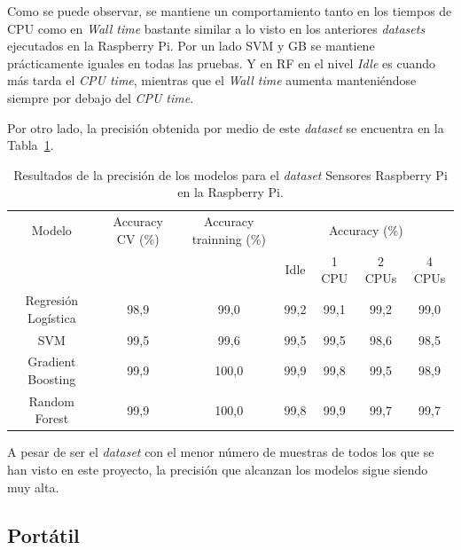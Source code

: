 \documentclass[a4paper, 12pt]{book}
\begin{document}
Como se puede observar, se mantiene un comportamiento tanto en los tiempos de CPU como en \textit{Wall time} bastante similar a lo visto en los anteriores \textit{datasets} ejecutados en la Raspberry Pi. Por un lado SVM y GB se mantiene prácticamente iguales en todas las pruebas. Y en RF en el nivel \textit{Idle} es cuando más tarda el \textit{CPU time}, mientras que el \textit{Wall time} aumenta manteniéndose siempre por debajo del \textit{CPU time}.

Por otro lado, la precisión obtenida por medio de este \textit{dataset} se encuentra en la Tabla~\ref{tab:acc_sensrasp}.\\
\begin{table}[htb]
\renewcommand{\arraystretch}{1.5}
\begin{adjustbox}{width=\textwidth}
\centering
    \begin{tabular}{c  c  c  c  c  c  c}
    \hline
    Modelo & Accuracy CV (\%) & Accuracy trainning (\%) & \multicolumn{4}{c}{Accuracy (\%)} \\
    \cline{4-7}
     &  &   &  Idle & 1 CPU & 2 CPUs & 4 CPUs \\
     \hline
     Regresión Logística & 98,9 & 99,0 & 99,2 & 99,1 & 99,2 & 99,0\\
     SVM & 99,5 & 99,6 & 99,5 & 99,5 & 98,6 & 98,5\\
     Gradient Boosting & 99,9 & 100,0 & 99,9 & 99,8 & 99,5 & 98,9\\
     Random Forest & 99,9 & 100,0 & 99,8 & 99,9 & 99,7 & 99,7\\
    \hline
    \end{tabular}
\end{adjustbox}
\caption{Resultados de la precisión de los modelos para el \textit{dataset} Sensores Raspberry Pi en la Raspberry Pi.}
\label{tab:acc_sensrasp}
\end{table}

A pesar de ser el \textit{dataset} con el menor número de muestras de todos los que se han visto en este proyecto, la precisión que alcanzan los modelos sigue siendo muy alta.

\subsection{Portátil}
\label{subsec:pc_sensados}
\end{document}
